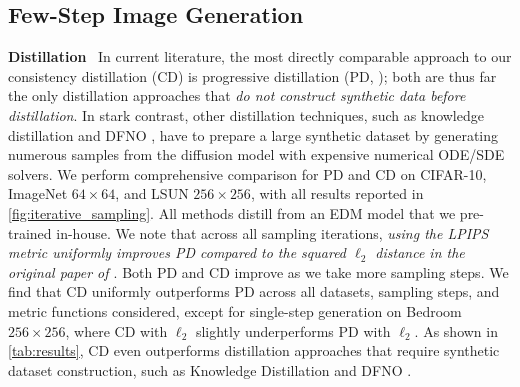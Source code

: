 \subsection{Few-Step Image Generation}
\textbf{Distillation}~ In current literature, the most directly comparable approach to our consistency distillation (CD) is progressive distillation (PD, \citet{salimans2022progressive}); both are thus far the only distillation approaches that \emph{do not construct synthetic data before distillation}. In stark contrast, other distillation techniques, such as knowledge distillation \cite{luhman2021knowledge} and DFNO \cite{zheng2022fast}, have to prepare a large synthetic dataset by generating numerous samples from the diffusion model with expensive numerical ODE/SDE solvers. We perform comprehensive comparison for PD and CD on CIFAR-10, ImageNet $64\times 64$, and LSUN $256\times 256$, with all results reported in \cref{fig:iterative_sampling}. All methods distill from an EDM \cite{karras2022edm} model that we pre-trained in-house. We note that across all sampling iterations, \emph{using the LPIPS metric uniformly improves PD compared to the squared $\ell_2$ distance in the original paper of \citet{salimans2022progressive}}. Both PD and CD improve as we take more sampling steps. We find that CD uniformly outperforms PD across all datasets, sampling steps, and metric functions considered, except for single-step generation on Bedroom $256\times 256$, where CD with $\ell_2$ slightly underperforms PD with $\ell_2$. As shown in \cref{tab:results}, CD even outperforms distillation approaches that require synthetic dataset construction, such as Knowledge Distillation \cite{luhman2021knowledge} and DFNO \cite{zheng2022fast}.

